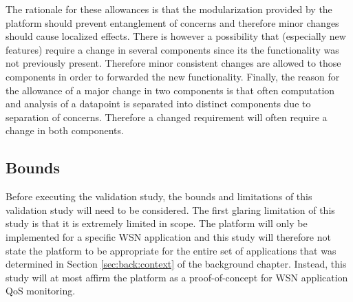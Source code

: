 The rationale for these allowances is that the modularization provided by the platform should prevent entanglement of concerns and therefore minor changes should cause localized effects. There is however a possibility that (especially new features) require a change in several components since its the functionality was not previously present. Therefore minor consistent changes are allowed to those components in order to forwarded the new functionality. Finally, the reason for the allowance of a major change in two components is that often computation and analysis of a datapoint is separated into distinct components due to separation of concerns. Therefore a changed requirement will often require a change in both components.


\subsection{Bounds}
Before executing the validation study, the bounds and limitations of this validation study will need to be considered. The first glaring limitation of this study is that it is extremely limited in scope. The platform will only be implemented for a specific WSN application and this study will therefore not state the platform to be appropriate for the entire set of applications that was determined in Section \ref{sec:back:context} of the background chapter. Instead, this study will at most affirm the platform as a proof-of-concept for WSN application QoS monitoring.

